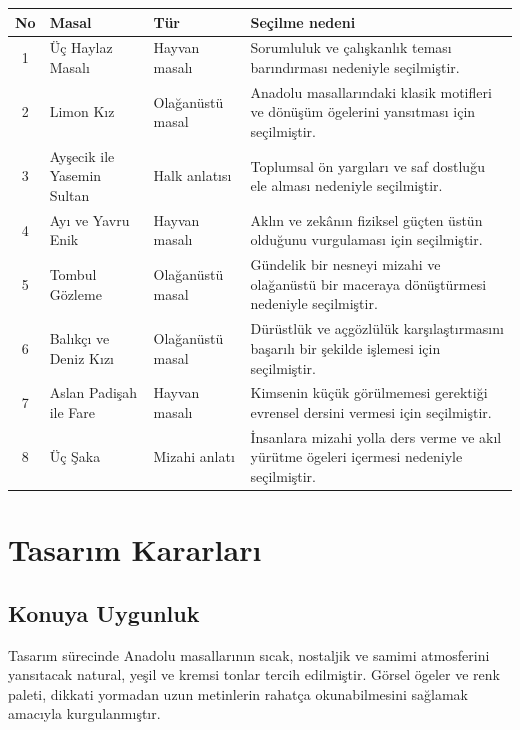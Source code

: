 \documentclass[12pt,a4paper]{article}
\begin{document}
\begin{longtable}{@{}cp{4cm}p{3cm}p{5.4cm}@{}}
\toprule
\textbf{No} & \textbf{Masal} & \textbf{Tür} & \textbf{Seçilme nedeni} \\
\midrule
\endhead
1 & Üç Haylaz Masalı & Hayvan masalı & Sorumluluk ve çalışkanlık teması barındırması nedeniyle seçilmiştir. \\
2 & Limon Kız & Olağanüstü masal & Anadolu masallarındaki klasik motifleri ve dönüşüm ögelerini yansıtması için seçilmiştir. \\
3 & Ayşecik ile Yasemin Sultan & Halk anlatısı & Toplumsal ön yargıları ve saf dostluğu ele alması nedeniyle seçilmiştir. \\
4 & Ayı ve Yavru Enik & Hayvan masalı & Aklın ve zekânın fiziksel güçten üstün olduğunu vurgulaması için seçilmiştir. \\
5 & Tombul Gözleme & Olağanüstü masal & Gündelik bir nesneyi mizahi ve olağanüstü bir maceraya dönüştürmesi nedeniyle seçilmiştir. \\
6 & Balıkçı ve Deniz Kızı & Olağanüstü masal & Dürüstlük ve açgözlülük karşılaştırmasını başarılı bir şekilde işlemesi için seçilmiştir. \\
7 & Aslan Padişah ile Fare & Hayvan masalı & Kimsenin küçük görülmemesi gerektiği evrensel dersini vermesi için seçilmiştir. \\
8 & Üç Şaka & Mizahi anlatı & İnsanlara mizahi yolla ders verme ve akıl yürütme ögeleri içermesi nedeniyle seçilmiştir. \\
\bottomrule
\end{longtable}

\section{Tasarım Kararları}

\subsection{Konuya Uygunluk}
Tasarım sürecinde Anadolu masallarının sıcak, nostaljik ve samimi atmosferini yansıtacak natural, yeşil ve kremsi tonlar tercih edilmiştir. Görsel ögeler ve renk paleti, dikkati yormadan uzun metinlerin rahatça okunabilmesini sağlamak amacıyla kurgulanmıştır.
\end{document}
